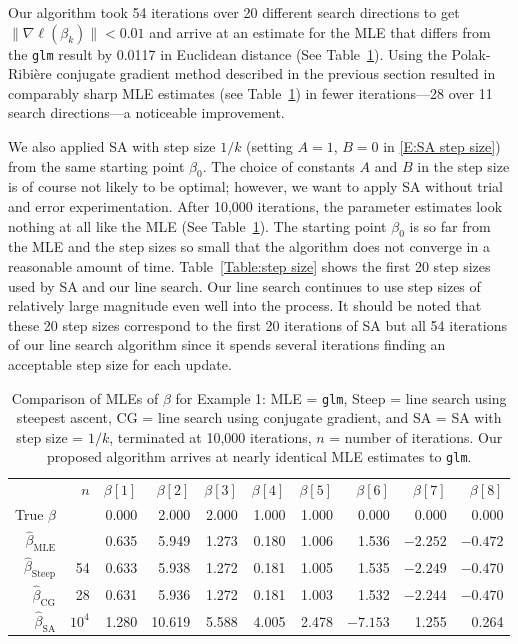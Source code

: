 Our algorithm took 54 iterations over 20 different search directions to get $\lVert 
\nabla \ell( \beta_k ) \rVert < 
0.01$ and arrive at an estimate for the MLE that differs from the \texttt{glm} result 
by 0.0117 in Euclidean distance 
(See Table~\ref{Table:Logistic}).  
Using the Polak-Ribi\`{e}re conjugate gradient method described in the previous 
section  resulted in comparably sharp 
MLE estimates (see Table~\ref{Table:Logistic}) in fewer iterations---28 over 11 search 
directions---a noticeable 
improvement. 

We also applied  SA with step size $1/k$ (setting $A=1$, $B=0$ in \eqref{E:SA step 
size}) from the same starting point 
$\beta_0$.  The choice of constants $A$ and $B$ in the step size is of course not 
likely to be optimal;
however, we want to apply SA without trial and error experimentation.  
After 10,000 iterations, the parameter estimates look nothing at all like the MLE (See 
Table~\ref{Table:Logistic}).  
The starting point $\beta_0$ is so far from the MLE and the step sizes so small that 
the algorithm does not converge in a reasonable amount of time.
Table~\ref{Table:step size} shows the first 20 step sizes used by SA and our line 
search. Our line search continues to 
use step sizes of relatively large magnitude even well into the process.  It should be 
noted that these 20 step sizes 
correspond to the first 20 iterations of SA but all 54 iterations of our line search 
algorithm since it spends several 
iterations finding an acceptable step size for each update.


\begin{table}
\caption[Comparison of MLEs of $\beta$ for logistic regression example]{Comparison of MLEs of $\beta$ for Example 1: MLE = \texttt{glm}, Steep = line 
search using steepest ascent, 
CG = line search using conjugate gradient, and SA =  SA with step size = $1/k$, 
terminated at 10,000 iterations,
$n$ = number of iterations.  Our 
proposed algorithm arrives at nearly identical MLE estimates to \texttt{glm}.}
\begin{center}
\begin{tabular}{rrrrrrrrrr}
  \hline
 & $n$ & $\beta[1]$ & $\beta[2]$ & $\beta[3]$ & $\beta[4]$ & $\beta[5]$ & $\beta[6]$ & 
$\beta[7]$ & $\beta[8]$ \\ 
True $\beta$ & & 0.000 & 2.000 & 2.000 & 1.000 & 1.000 & 0.000 & 0.000 & 0.000 \\ 
  $\hat{\beta}_{\textrm{MLE}}$ & & 0.635 & 5.949 & 1.273 & 0.180 & 1.006 & 1.536 & 
$-2.252$ & $-0.472$ \\ 
  $\hat{\beta}_{\textrm{Steep}}$ & 54 & 0.633 & 5.938 & 1.272 & 0.181 & 1.005 & 1.535 
& $-2.249$ & $-0.470$ \\ 
  $\hat{\beta}_{\textrm{CG}}$ & 28 & 0.631 & 5.936 & 1.272 & 0.181 & 1.003 & 1.532 & 
$-2.244$ & $-0.470$ \\    
  $\hat{\beta}_{\textrm{SA}}$ & $10^4$ & 1.280 & 10.619 & 5.588 & 4.005 & 2.478 & 
$-7.153$ & 1.255 & 0.264 \\ 
  \hline
\end{tabular}
\end{center}
\label{Table:Logistic}
\end{table}

